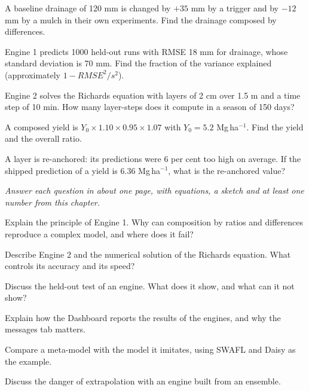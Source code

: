 \begin{exlist}
\item A baseline drainage of 120 mm is changed by $+35$ mm by a trigger and by $-12$ mm by a mulch in their own experiments. Find the drainage composed by differences.\exans{143 mm}
\item Engine 1 predicts 1000 held-out runs with RMSE 18 mm for drainage, whose standard deviation is 70 mm. Find the fraction of the variance explained (approximately $1-RMSE^2/s^2$).
\item Engine 2 solves the Richards equation with layers of 2 cm over 1.5 m and a time step of 10 min. How many layer-steps does it compute in a season of 150 days?
\item A composed yield is $Y_0\times1.10\times0.95\times1.07$ with $Y_0=5.2$ Mg\,ha$^{-1}$. Find the yield and the overall ratio.
\item A layer is re-anchored: its predictions were 6 per cent too high on average. If the shipped prediction of a yield is 6.36 Mg\,ha$^{-1}$, what is the re-anchored value?
\end{exlist}
{\small\itshape Answer each question in about one page, with equations, a sketch and at least one number from this chapter.}\par\vspace{3pt}
\begin{exlist}
\item Explain the principle of Engine 1. Why can composition by ratios and differences reproduce a complex model, and where does it fail?
\item Describe Engine 2 and the numerical solution of the Richards equation. What controls its accuracy and its speed?
\item Discuss the held-out test of an engine. What does it show, and what can it not show?
\item Explain how the Dashboard reports the results of the engines, and why the messages tab matters.
\item Compare a meta-model with the model it imitates, using SWAFL and Daisy as the example.
\item Discuss the danger of extrapolation with an engine built from an ensemble.
\end{exlist}
